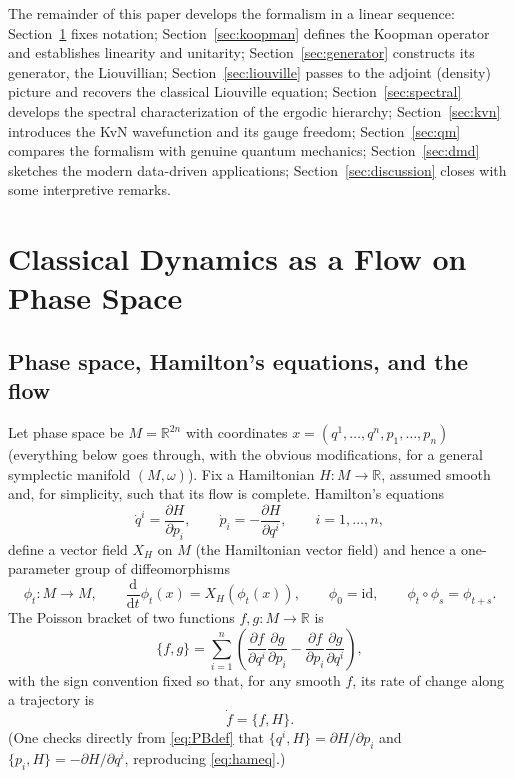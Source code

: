 \documentclass[11pt]{article}
\theoremstyle{remark}
\newcommand{\PB}[2]{\{#1,#2\}}
\newcommand{\dd}{\mathrm{d}}
\newcommand{\R}{\mathbb{R}}
\begin{document}
The remainder of this paper develops the formalism in a linear sequence: Section~\ref{sec:setup} fixes notation; Section~\ref{sec:koopman} defines the Koopman operator and establishes linearity and unitarity; Section~\ref{sec:generator} constructs its generator, the Liouvillian; Section~\ref{sec:liouville} passes to the adjoint (density) picture and recovers the classical Liouville equation; Section~\ref{sec:spectral} develops the spectral characterization of the ergodic hierarchy; Section~\ref{sec:kvn} introduces the KvN wavefunction and its gauge freedom; Section~\ref{sec:qm} compares the formalism with genuine quantum mechanics; Section~\ref{sec:dmd} sketches the modern data-driven applications; Section~\ref{sec:discussion} closes with some interpretive remarks.

\section{Classical Dynamics as a Flow on Phase Space}
\label{sec:setup}

\subsection{Phase space, Hamilton's equations, and the flow}

Let phase space be $M=\R^{2n}$ with coordinates $x=(q^1,\dots,q^n,p_1,\dots,p_n)$ (everything below goes through, with the obvious modifications, for a general symplectic manifold $(M,\omega)$). Fix a Hamiltonian $H:M\to\R$, assumed smooth and, for simplicity, such that its flow is complete. Hamilton's equations
\begin{equation}
\dot q^i = \frac{\partial H}{\partial p_i}, \qquad \dot p_i = -\frac{\partial H}{\partial q^i}, \qquad i=1,\dots,n,
\label{eq:hameq}
\end{equation}
define a vector field $X_H$ on $M$ (the Hamiltonian vector field) and hence a one-parameter group of diffeomorphisms
\begin{equation}
\phi_t : M \to M, \qquad \frac{\dd}{\dd t}\phi_t(x) = X_H(\phi_t(x)), \qquad \phi_0=\mathrm{id}, \qquad \phi_t\circ\phi_s=\phi_{t+s}.
\label{eq:flow}
\end{equation}
The Poisson bracket of two functions $f,g:M\to\R$ is
\begin{equation}
\PB{f}{g} = \sum_{i=1}^n\left(\frac{\partial f}{\partial q^i}\frac{\partial g}{\partial p_i}-\frac{\partial f}{\partial p_i}\frac{\partial g}{\partial q^i}\right),
\label{eq:PBdef}
\end{equation}
with the sign convention fixed so that, for any smooth $f$, its rate of change along a trajectory is
\begin{equation}
\dot f = \PB{f}{H}.
\label{eq:eom}
\end{equation}
(One checks directly from \eqref{eq:PBdef} that $\PB{q^i}{H}=\partial H/\partial p_i$ and $\PB{p_i}{H}=-\partial H/\partial q^i$, reproducing \eqref{eq:hameq}.)
\end{document}
